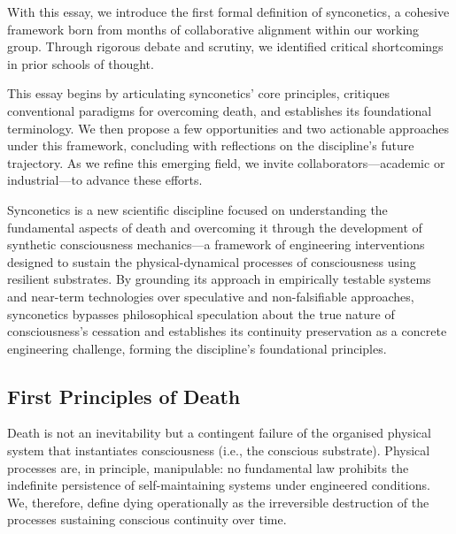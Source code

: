 \documentclass[10pt]{article}
\begin{document}
\begin{sloppypar}
  With this essay, we introduce the first formal definition of synconetics, a cohesive framework born from months of collaborative alignment within our working group. Through rigorous debate and scrutiny, we identified critical shortcomings in prior schools of thought.

  This essay begins by articulating synconetics’ core principles, critiques conventional paradigms for overcoming death, and establishes its foundational terminology. We then propose a few opportunities and two actionable approaches under this framework, concluding with reflections on the discipline’s future trajectory. As we refine this emerging field, we invite collaborators—academic or industrial—to advance these efforts.

  Synconetics is a new scientific discipline focused on understanding the fundamental aspects of death and overcoming it through the development of synthetic consciousness mechanics—a framework of engineering interventions designed to sustain the physical-dynamical processes of consciousness using resilient substrates. By grounding its approach in empirically testable systems and near-term technologies over speculative and non-falsifiable approaches, synconetics bypasses philosophical speculation about the true nature of consciousness’s cessation and establishes its continuity preservation as a concrete engineering challenge, forming the discipline’s foundational principles.

  \subsection{First Principles of Death}
  \label{sec:first-principles}

  Death is not an inevitability but a contingent failure of the organised physical system that instantiates consciousness (i.e., the conscious substrate). Physical processes are, in principle, manipulable: no fundamental law prohibits the indefinite persistence of self-maintaining systems under engineered conditions. We, therefore, define dying operationally as the irreversible destruction of the processes sustaining conscious continuity over time.


\end{sloppypar}
\end{document}

